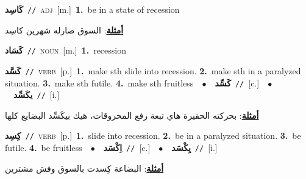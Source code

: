 \documentclass[10pt,a4paper,twoside]{article} %
\begin{document}
\begin{multicols}{2}
{\setlength\topsep{0pt}\textbf{\foreignlanguage{arabic}{كَاسِد}}\ {\color{gray}\texttt{//}\color{black}}\ \textsc{adj}\ [m.]\ \textbf{1.}~be in a state of recession\  \begin{flushright}\color{gray}\foreignlanguage{arabic}{\textbf{\underline{\foreignlanguage{arabic}{أمثلة}}}: السوق صارله شهرين كاسِد}\end{flushright}\color{black}} \vspace{2mm}

{\setlength\topsep{0pt}\textbf{\foreignlanguage{arabic}{كَسَاد}}\ {\color{gray}\texttt{//}\color{black}}\ \textsc{noun}\ [m.]\ \textbf{1.}~recession\ } \vspace{2mm}

{\setlength\topsep{0pt}\textbf{\foreignlanguage{arabic}{كَسَّد}}\ {\color{gray}\texttt{//}\color{black}}\ \textsc{verb}\ [p.]\ \textbf{1.}~make sth slide into recession.  \textbf{2.}~make sth in a paralyzed situation.  \textbf{3.}~make sth futile.  \textbf{4.}~make sth fruitless\ \ $\bullet$\ \ \setlength\topsep{0pt}\textbf{\foreignlanguage{arabic}{كَسِّد}}\ {\color{gray}\texttt{//}\color{black}}\ [c.]\ \ $\bullet$\ \ \setlength\topsep{0pt}\textbf{\foreignlanguage{arabic}{يكَسِّد}}\ {\color{gray}\texttt{//}\color{black}}\ [i.]\  \begin{flushright}\color{gray}\foreignlanguage{arabic}{\textbf{\underline{\foreignlanguage{arabic}{أمثلة}}}: بحركته الحقيرة هاي تبعة رفع المحروقات، هيك بيكَسِّد البضايع كلها}\end{flushright}\color{black}} \vspace{2mm}

{\setlength\topsep{0pt}\textbf{\foreignlanguage{arabic}{كِسِد}}\ {\color{gray}\texttt{//}\color{black}}\ \textsc{verb}\ [p.]\ \textbf{1.}~slide into recession.  \textbf{2.}~be in a paralyzed situation.  \textbf{3.}~be futile.  \textbf{4.}~be fruitless\ \ $\bullet$\ \ \setlength\topsep{0pt}\textbf{\foreignlanguage{arabic}{اِكْسَد}}\ {\color{gray}\texttt{//}\color{black}}\ [c.]\ \ $\bullet$\ \ \setlength\topsep{0pt}\textbf{\foreignlanguage{arabic}{يِكْسَد}}\ {\color{gray}\texttt{//}\color{black}}\ [i.]\  \begin{flushright}\color{gray}\foreignlanguage{arabic}{\textbf{\underline{\foreignlanguage{arabic}{أمثلة}}}: البضاعة كِسدت بالسوق وفش مشترين}\end{flushright}\color{black}} \vspace{2mm}


\end{multicols}
\end{document}
